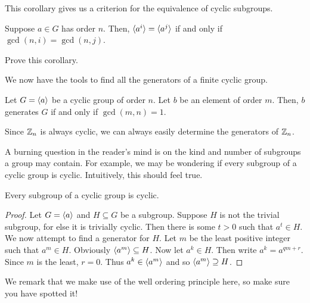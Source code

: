 \documentclass[./algebra-notes.tex]{subfiles}
\begin{document}
This corollary gives us a criterion for the equivalence of cyclic subgroups.
\begin{corollary}
    Suppose $a \in G$ has order $n$. Then, ${ \langle a^i \rangle } = { \langle a^j \rangle }$ if and only
    if $\gcd(n,i) = \gcd(n,j)$. 
\end{corollary}
\begin{exercise}
    Prove this corollary.
\end{exercise}

We now have the tools to find all the generators of a finite cyclic group.
\begin{corollary}
\label{cor:generator-of-group-criteria}
    Let $G = { \langle a \rangle }$ be a cyclic group of order $n$. Let $b$ be an element of
    order $m$. Then, $b$ generates $G$ if and only if $\gcd(m, n) = 1$.
\end{corollary}
Since $\mathbb{Z}_n$ is always cyclic, we can always easily determine the generators of $\mathbb{Z}_n$.

A burning question in the reader's mind is on the kind and number of subgroups a
group may contain. For example, we may be wondering if every subgroup of a
cyclic group is cyclic. Intuitively, this should feel true. 
\begin{theorem}
\label{thm:subgroups-of-cyclic-group-are-cyclic}
    Every subgroup of a cyclic group is cyclic. 
\end{theorem}
\begin{proof}
    Let $G = { \langle a \rangle }$ and $H \subseteq G$ be a subgroup. Suppose $H$ is not the
    trivial subgroup, for else it is trivially cyclic. Then there is some $t >
    0$ such that $a^t \in H$. We now attempt to find a generator for $H$. Let
    $m$ be the least positive integer such that $a^m \in H$. Obviously
    ${ \langle a^m \rangle } \subseteq H$. Now let $a^k \in H$. Then write $a^k = a^{qm + r}$.
    Since $m$ is the least, $r = 0$. Thus $a^k \in { \langle a^m \rangle }$ and so ${ \langle a^m \rangle }
    \supseteq H$.
\end{proof}
We remark that we make use of the well ordering principle here, so make sure you
have spotted it!
\end{document}
